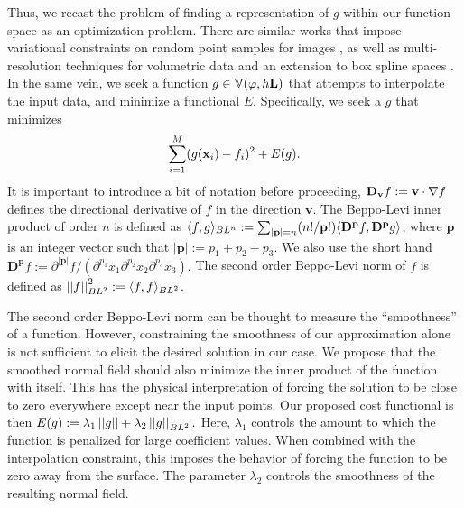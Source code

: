 Thus, we recast the problem of finding a representation of $g$ within our function space as an optimization problem. There are similar works that impose variational constraints on random point samples for images \cite{variational}, as well as multi-resolution techniques for volumetric data \cite{onvari} and an extension to box spline spaces \cite{xu2012rec}. In the same vein, we seek a function $g \in \fspce{\varphi}{h\mathbf{L}}$ that attempts to interpolate the input data, and minimize a functional $E$. Specifically, we seek a $g$ that minimizes {\small 
\begin{equation} \label{eq:minexp}
 	\sump_{i=1}^{M} (g(\vx_i) -  f_i)^2 + E(g).
\end{equation}}
It is important to introduce a bit of notation before proceeding, $\dv{\mathbf{v}} f := \mathbf{v} \cdot \grad f$ defines the directional derivative of $f$ in the direction $\mathbf{v}$. The Beppo-Levi inner product of order $n$ is defined as $\blip{n}{f}{g}:= \sum_{|\mathbf{p}|=n}({n!}/{\mathbf{p}!}) \innerp{\mathbf{D^p}f}{\mathbf{D^p}g}$, where $\mathbf{p}$ is an integer vector such that $\left| \mathbf{p}\right| := p_1 + p_2 + p_3 $. We also use the short hand $\mathbf{D^p}f := \partial^{\left| \mathbf{p}\right|}f/({\partial^{p_1}x_1}{\partial^{p_2}x_2}{\partial^{p_3}x_3}).$ The second order Beppo-Levi norm of $f$ is defined as $\bln{2}{f}^2:=\blip{2}{f}{f}$.

The second order Beppo-Levi norm can be thought to measure the ``smoothness'' of a function. However, constraining the smoothness of our approximation alone is not sufficient to elicit the desired solution in our case. We propose that the smoothed normal field should also minimize the inner product of the function with itself. This has the physical interpretation of forcing the solution to be close to zero everywhere except near the input points. Our proposed cost functional is then $E(g) := \lambda_1 \left|\left|{g}\right|\right| + \lambda_2 \bln{2}{g}.$ Here, $\lambda_1$ controls the amount to which the function is penalized for large coefficient values. When combined with the interpolation constraint, this imposes the behavior of forcing the function to be zero away from the surface. The parameter $\lambda_2$ controls the smoothness of the resulting normal field.

